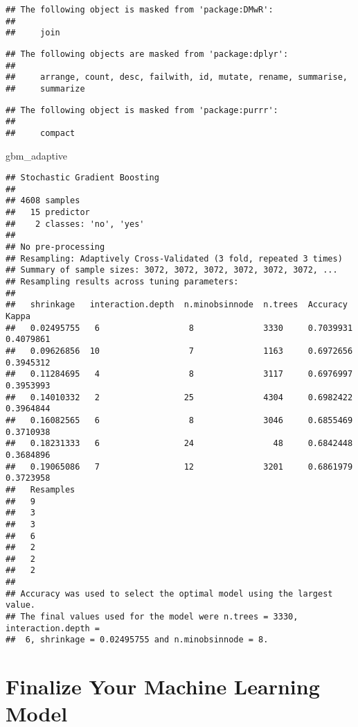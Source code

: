 \documentclass[
]{book}
\newenvironment{Shaded}{\begin{snugshade}}{\end{snugshade}}
\newcommand{\NormalTok}[1]{#1}
\begin{document}
\begin{verbatim}
## The following object is masked from 'package:DMwR':
## 
##     join
\end{verbatim}

\begin{verbatim}
## The following objects are masked from 'package:dplyr':
## 
##     arrange, count, desc, failwith, id, mutate, rename, summarise,
##     summarize
\end{verbatim}

\begin{verbatim}
## The following object is masked from 'package:purrr':
## 
##     compact
\end{verbatim}

\begin{Shaded}
\begin{Highlighting}[]
\NormalTok{gbm\_adaptive}
\end{Highlighting}
\end{Shaded}

\begin{verbatim}
## Stochastic Gradient Boosting 
## 
## 4608 samples
##   15 predictor
##    2 classes: 'no', 'yes' 
## 
## No pre-processing
## Resampling: Adaptively Cross-Validated (3 fold, repeated 3 times) 
## Summary of sample sizes: 3072, 3072, 3072, 3072, 3072, 3072, ... 
## Resampling results across tuning parameters:
## 
##   shrinkage   interaction.depth  n.minobsinnode  n.trees  Accuracy   Kappa    
##   0.02495755   6                  8              3330     0.7039931  0.4079861
##   0.09626856  10                  7              1163     0.6972656  0.3945312
##   0.11284695   4                  8              3117     0.6976997  0.3953993
##   0.14010332   2                 25              4304     0.6982422  0.3964844
##   0.16082565   6                  8              3046     0.6855469  0.3710938
##   0.18231333   6                 24                48     0.6842448  0.3684896
##   0.19065086   7                 12              3201     0.6861979  0.3723958
##   Resamples
##   9        
##   3        
##   3        
##   6        
##   2        
##   2        
##   2        
## 
## Accuracy was used to select the optimal model using the largest value.
## The final values used for the model were n.trees = 3330, interaction.depth =
##  6, shrinkage = 0.02495755 and n.minobsinnode = 8.
\end{verbatim}

\hypertarget{finalize-your-machine-learning-model}{%
\section{Finalize Your Machine Learning Model}\label{finalize-your-machine-learning-model}}
\end{document}
